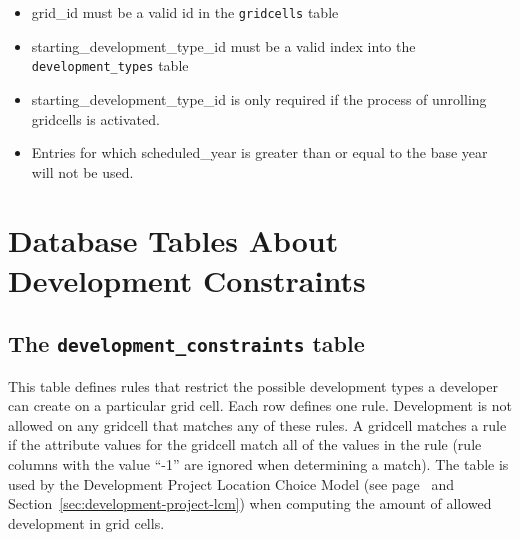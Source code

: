 \begin{itemize} \tight
\item grid_id must be a valid id in the \verb|gridcells| table
\item starting_development_type_id must be a valid index into the \verb|development_types| table
\item starting_development_type_id is only required if the process of unrolling gridcells is activated.
\item Entries for which scheduled_year is greater than or equal to the base year will not be used.
\end{itemize}

\section{Database Tables About Development Constraints}
%
\subsection{The {\tt development_constraints} table}
%
This table defines rules that restrict the possible development types a
developer can create on a particular grid cell.  Each row defines one rule.
Development is not allowed on any gridcell that matches any of these rules.  A
gridcell matches a rule if the attribute values for the gridcell match all of
the values in the rule (rule columns with the value ``-1'' are ignored when
determining a match). The table is used by the Development Project Location Choice Model 
(see page~\pageref{real-estate-development-model-gridcell} and Section~\ref{sec:development-project-lcm}) 
when computing the amount of allowed development 
in grid cells.

